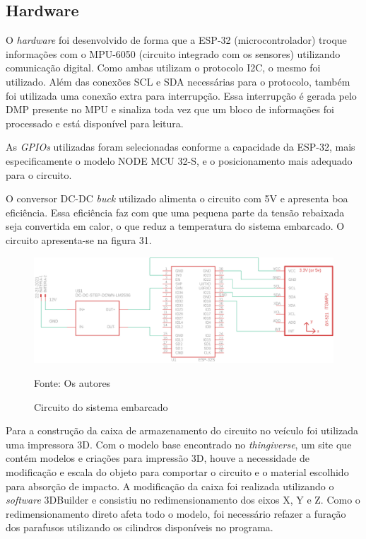 \subsection{\textbf{Hardware}}

O \textit{hardware} foi desenvolvido de forma que a ESP-32 (microcontrolador) troque informações com o MPU-6050 (circuito integrado com os sensores) utilizando  comunicação digital. Como ambas utilizam o protocolo I2C, o mesmo foi utilizado.
Além das conexões SCL e SDA necessárias para o protocolo, também foi utilizada uma conexão extra para interrupção. Essa interrupção é gerada pelo DMP presente no MPU e sinaliza toda vez que um bloco de informações foi processado e está disponível para leitura.

As \textit{GPIOs} utilizadas foram selecionadas conforme a capacidade da ESP-32, mais especificamente o modelo NODE MCU 32-S, e o posicionamento mais adequado para o circuito.

O conversor DC-DC \textit{buck} utilizado alimenta o circuito com 5V e apresenta  boa eficiência. Essa eficiência faz com que uma pequena parte da tensão rebaixada seja convertida em calor, o que reduz a temperatura do sistema embarcado.
O circuito apresenta-se na figura 31.

 \begin{figure}[H]

\begin{center}
     \caption{Circuito do sistema embarcado }
  \includegraphics[width=150mm]{images/Cap4/Esquema_esp.png}
\end{center}
 \scriptsize Fonte: Os autores
  
\end{figure}




Para a construção da caixa de armazenamento do circuito no veículo foi utilizada uma impressora 3D. Com o modelo base  encontrado no \textit{thingiverse}, um site que contém modelos e criações para impressão 3D, houve a necessidade de modificação e escala do objeto para comportar o circuito e o material escolhido para absorção de impacto. A modificação da caixa foi realizada utilizando o \textit{software} 3DBuilder e consistiu no redimensionamento dos eixos X, Y e Z. Como o redimensionamento direto afeta todo o modelo, foi necessário refazer a furação dos parafusos utilizando os cilindros disponíveis no programa.

